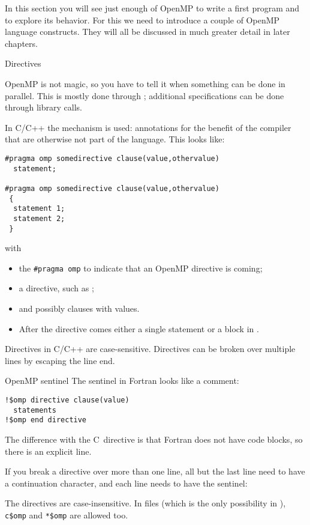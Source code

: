 In this section you will see just enough of OpenMP to write a first
program and to explore its behavior. For this we need to introduce a
couple of OpenMP language constructs. They will all be discussed in
much greater detail in later chapters.

 {Directives}
\label{sec:omp-directives}

OpenMP is not magic, so you have to tell it when something
can be done in parallel. This is mostly done through ;
additional specifications can be done through library calls.

In C/C++ the  mechanism is used: annotations for
the benefit of the compiler that are otherwise not part of the
language. This looks like:
\begin{lstlisting}
#pragma omp somedirective clause(value,othervalue)
  statement;

#pragma omp somedirective clause(value,othervalue)
 {
  statement 1;
  statement 2;
 }
\end{lstlisting}
with
\begin{itemize}
\item the \verb+#pragma omp+  to indicate that
  an OpenMP directive is coming;
\item a directive, such as ;
\item and possibly clauses with values.
\item After the directive comes either a single statement or a block
  in .
\end{itemize}
Directives in C/C++ are case-sensitive. Directives can be broken over
multiple lines by escaping the line end.

\begin{fortrannote}{OpenMP sentinel}
The sentinel in Fortran looks like a comment:
\begin{lstlisting}
!$omp directive clause(value)
  statements
!$omp end directive
\end{lstlisting}
The difference with the C~directive is that
Fortran does not have code blocks, so there is an explicit
 line.

If you break a directive over more than one line, all but the last line
need to have a continuation character, and each line needs to have the sentinel:
%

The directives are case-insensitive.
In
 files
(which is the only possibility in ),
\verb+c$omp+ and \verb+*$omp+ are allowed too.
\end{fortrannote}

